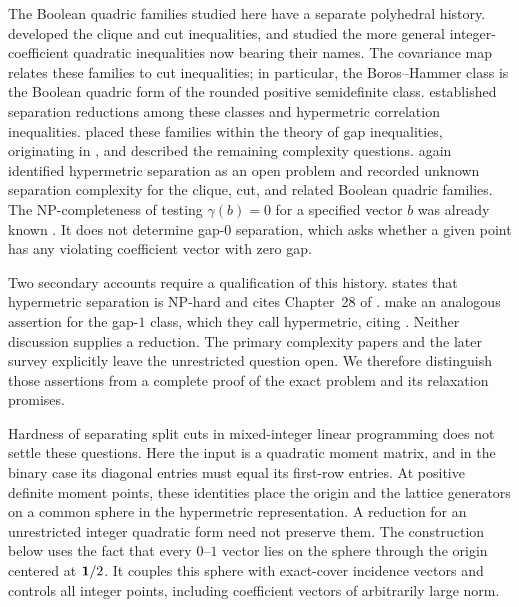 The Boolean quadric families studied here have a separate polyhedral
history.  \citet{Padberg1989} developed the clique and cut inequalities,
and \citet{BorosHammer1993} studied the more general integer-coefficient
quadratic inequalities now bearing their names.  The covariance map
relates these families to cut inequalities; in particular, the
Boros--Hammer class is the Boolean quadric form of the rounded positive
semidefinite class.  \citet{LetchfordSorensen2012} established
separation reductions among these classes and hypermetric correlation
inequalities.  \citet{GKL2011,GKL2012} placed these families within the
theory of gap inequalities, originating in
\citet{LaurentPoljak1996}, and described the remaining complexity
questions.  \citet{Letchford2022} again identified hypermetric
separation as an open problem and recorded unknown separation
complexity for the clique, cut, and related Boolean quadric families.
The NP-completeness of testing $\gamma(b)=0$ for a specified vector
$b$ was already known \citep[\S2]{GKL2012}.  It does not determine
gap-$0$ separation, which asks whether a given point has any violating
coefficient vector with zero gap.

Two secondary accounts require a qualification of this history.
\citet[p.~23]{Liers2004} states that hypermetric separation is NP-hard
and cites Chapter~28 of \citet{DezaLaurent1997}.
\citet[\S6, ``The hypermetric inequalities'']{KrishnanTerlaky2005}
make an analogous assertion for the gap-$1$ class, which they call
hypermetric, citing \citet{AvisGrishukhin1993,Avis2003}.
Neither discussion supplies a reduction.  The primary complexity
papers and the later survey explicitly leave the unrestricted
question open.  We therefore distinguish those assertions from a
complete proof of the exact problem and its relaxation promises.

Hardness of separating split cuts in mixed-integer linear programming
\citep{CapraraLetchford2003} does not settle these questions.  Here the
input is a quadratic moment matrix, and in the binary case its
diagonal entries must equal its first-row entries.  At positive
definite moment points, these identities place the origin and the
lattice generators on a common sphere in the hypermetric representation.
A reduction for an unrestricted integer quadratic form
need not preserve them.  The construction below uses the fact that
every $0$--$1$ vector lies on the sphere through the origin centered at
$\mathbf 1/2$.  It couples this sphere with exact-cover incidence vectors
and controls all integer points, including coefficient vectors of
arbitrarily large norm.

